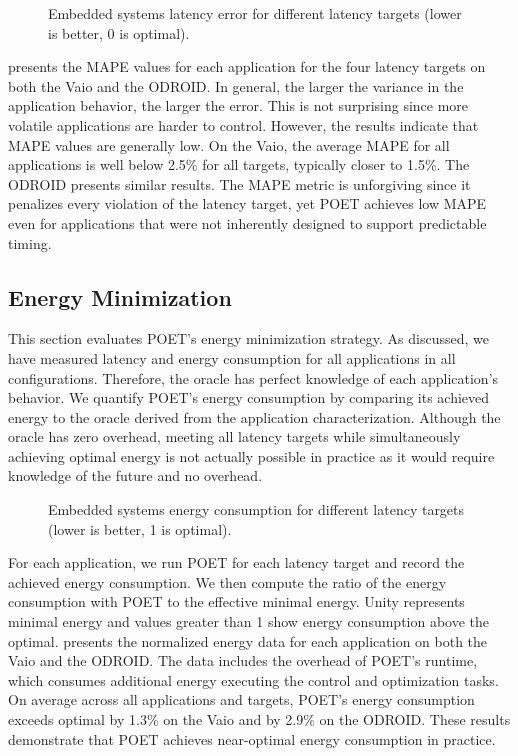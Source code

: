 \begin{figure}[t]
  \centering
    
  \caption{Embedded systems latency error for different latency targets (lower is better, 0 is optimal).}
  \label{fig:poet-embedded-mape}
\end{figure}

 presents the MAPE values for each application for the four latency targets on both the Vaio and the ODROID.
In general, the larger the variance in the application behavior, the larger the error.
This is not surprising since more volatile applications are harder to control.
However, the results indicate that MAPE values are generally low.
On the Vaio, the average MAPE for all applications is well below 2.5\% for all targets, typically closer to 1.5\%.
The ODROID presents similar results.
The MAPE metric is unforgiving since it penalizes every violation of the latency target, yet POET achieves low MAPE even for applications that were not inherently designed to support predictable timing.


\subsection{Energy Minimization}

This section evaluates POET's energy minimization strategy.
As discussed, we have measured latency and energy consumption for all applications in all configurations.
Therefore, the oracle has perfect knowledge of each application's behavior.
We quantify POET's energy consumption by comparing its achieved energy to the oracle derived from the application characterization.
Although the oracle has zero overhead, meeting all latency targets while simultaneously achieving optimal energy is not actually possible in practice as it would require knowledge of the future and no overhead.


\begin{figure}[t]
  \centering
    
  \caption{Embedded systems energy consumption for different latency targets (lower is better, 1 is optimal).}
  \label{fig:poet-embedded-ee}
\end{figure}

For each application, we run POET for each latency target and record the achieved energy consumption.
We then compute the ratio of the energy consumption with POET to the effective minimal energy.
Unity represents minimal energy and values greater than 1 show energy consumption above the optimal.
 presents the normalized energy data for each application on both the Vaio and the ODROID.
The data includes the overhead of POET's runtime, which consumes additional energy executing the control and optimization tasks.
On average across all applications and targets, POET's energy consumption exceeds optimal by 1.3\% on the Vaio and by 2.9\% on the ODROID.
These results demonstrate that POET achieves near-optimal energy consumption in practice.

